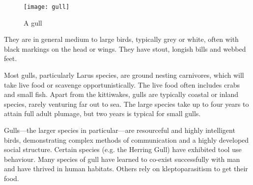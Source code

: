 \documentclass[a4paper,12pt]{article}
\begin{document}
\begin{wrapfigure}{l}{0.5\textwidth}
  \begin{center}
    \texttt{[image: gull]}
  \end{center}
  \caption{A gull}
\end{wrapfigure}

They are in general medium to large birds, typically grey or white,
often with black markings on the head or wings. They have stout,
longish bills and webbed feet.

Most gulls, particularly Larus species, are ground nesting carnivores,
which will take live food or scavenge opportunistically. The live food
often includes crabs and small fish. Apart from the kittiwakes, gulls
are typically coastal or inland species, rarely venturing far out to sea.
The large species take up to four years to attain full adult plumage,
but two years is typical for small gulls.

Gulls---the larger species in particular---are resourceful and
highly intelligent birds, demonstrating complex methods of communication
and a highly developed social structure. Certain species (e.g. the
Herring Gull) have exhibited tool use behaviour. Many species of gull have
learned to co-exist successfully with man and have thrived in human habitats.
Others rely on kleptoparasitism to get their food.
\end{document}
